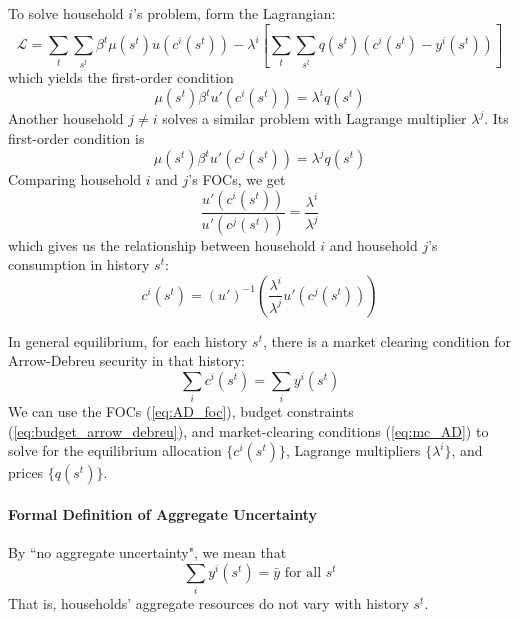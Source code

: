 \documentclass[12pt]{article}
\begin{document}
To solve household $i$'s problem, form the Lagrangian:
\begin{equation}
	\mathcal{L} = \sum_t \sum_{s^t} \beta^t \mu(s^t) u(c^i(s^t)) - \lambda^i \left[\sum_t \sum_{s^t} q(s^t) (c^i(s^t) - y^i(s^t))  \right]
\end{equation}
which yields the first-order condition
\begin{equation} \label{eq:AD_foc}
	\mu(s^t) \beta^t u'(c^i(s^t)) = \lambda^i q(s^t)
\end{equation}
Another household $j \neq i$ solves a similar problem with Lagrange multiplier $\lambda^j$. Its first-order condition is 
\[\mu(s^t) \beta^t u'(c^j(s^t)) = \lambda^j q(s^t)\]
Comparing household $i$ and $j$'s FOCs, we get
\begin{equation}
	\frac{u'(c^i(s^t))}{u'(c^j(s^t))} = \frac{\lambda^i}{\lambda^j}
\end{equation}
which gives us the relationship between household $i$ and household $j$'s consumption in history $s^t$:
\begin{equation} \label{eq:c_i_c_j}
	c^i(s^t) = (u')^{-1} \left(\frac{\lambda^i}{\lambda^j}u'(c^j(s^t))\right)
\end{equation}

In general equilibrium, for each history $s^t$, there is a market clearing condition for Arrow-Debreu security in that history: 
\begin{equation} \label{eq:mc_AD}
	\sum_i c^i(s^t) = \sum_i y^i(s^t)
\end{equation}
We can use the FOCs (\ref{eq:AD_foc}), budget constraints (\ref{eq:budget_arrow_debreu}), and market-clearing conditions (\ref{eq:mc_AD}) to solve for the equilibrium allocation $\{c^i(s^t)\}$, Lagrange multipliers $\{\lambda^i\}$, and prices $\{q(s^t)\}$.

\paragraph{Formal Definition of Aggregate Uncertainty}
By ``no aggregate uncertainty", we mean that 
\begin{equation}
	\sum_i y^i(s^t) = \bar{y} \text{ for all $s^t$}
\end{equation}
That is, households' aggregate resources do not vary with history $s^t$.
\end{document}
